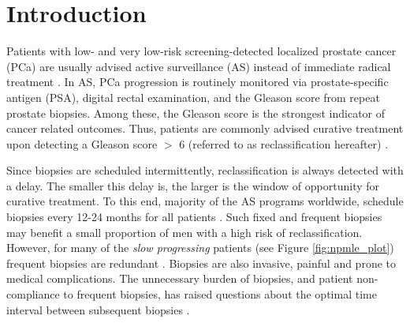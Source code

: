 \section{Introduction}

Patients with low- and very low-risk screening-detected localized prostate cancer (PCa) are usually advised active surveillance (AS) instead of immediate radical treatment \citep{briganti2018active}. In AS, PCa progression is routinely monitored via prostate-specific antigen (PSA), digital rectal examination, and the Gleason score from repeat prostate biopsies. Among these, the Gleason score is the strongest indicator of cancer related outcomes. Thus, patients are commonly advised curative treatment upon detecting a Gleason score $>$ 6 (referred to as reclassification hereafter) \citep{bul2013active}.

Since biopsies are scheduled intermittently, reclassification is always detected with a delay. The smaller this delay is, the larger is the window of opportunity for curative treatment. To this end, majority of the AS programs worldwide, schedule biopsies every 12-24 months for all patients \citep{nieboer2018active,loeb2014heterogeneity}. Such fixed and frequent biopsies may benefit a small proportion of men with a high risk of reclassification. However, for many of the \textit{slow progressing} patients (see Figure \ref{fig:npmle_plot}) frequent biopsies are redundant . Biopsies are also invasive, painful and prone to medical complications. The unnecessary burden of biopsies, and patient non-compliance \citep{bokhorst2015compliance} to frequent biopsies, has raised questions about the optimal time interval between subsequent biopsies \citep{inoue2018comparative, bratt2013study}.

